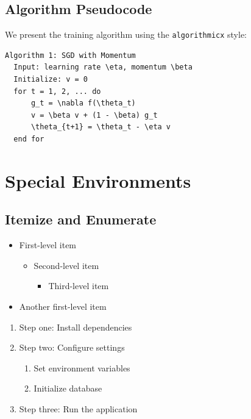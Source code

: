 \documentclass[11pt,a4paper]{article}
\begin{document}
\subsection{Algorithm Pseudocode}
We present the training algorithm using the \texttt{algorithmicx} style:

\begin{center}
\begin{minipage}{0.8\textwidth}
\begin{verbatim}
Algorithm 1: SGD with Momentum
  Input: learning rate \eta, momentum \beta
  Initialize: v = 0
  for t = 1, 2, ... do
      g_t = \nabla f(\theta_t)
      v = \beta v + (1 - \beta) g_t
      \theta_{t+1} = \theta_t - \eta v
  end for
\end{verbatim}
\end{minipage}
\end{center}

\section{Special Environments}

\subsection{Itemize and Enumerate}

\begin{itemize}
    \item First-level item
    \begin{itemize}
        \item Second-level item
        \begin{itemize}
            \item Third-level item
        \end{itemize}
    \end{itemize}
    \item Another first-level item
\end{itemize}

\begin{enumerate}
    \item Step one: Install dependencies
    \item Step two: Configure settings
    \begin{enumerate}
        \item Set environment variables
        \item Initialize database
    \end{enumerate}
    \item Step three: Run the application
\end{enumerate}
\end{document}
